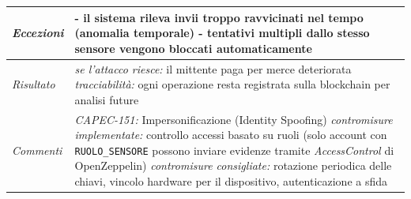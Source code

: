 \begin{longtable}{| >{\columncolor{abuseCol}}p{} | p{} |}
\hline
\textit{Eccezioni} & - il sistema rileva invii troppo ravvicinati nel tempo (anomalia temporale) \newline - tentativi multipli dallo stesso sensore vengono bloccati automaticamente \\
\hline
\textit{Risultato} & \textit{se l'attacco riesce:} il mittente paga per merce deteriorata \newline \textit{tracciabilità:} ogni operazione resta registrata sulla blockchain per analisi future \\
\hline
\textit{Commenti} & \textit{CAPEC-151:} Impersonificazione (Identity Spoofing) \newline \textit{contromisure implementate:} controllo accessi basato su ruoli (solo account con \texttt{RUOLO\_SENSORE} possono inviare evidenze tramite \textit{AccessControl} di OpenZeppelin) \newline \textit{contromisure consigliate:} rotazione periodica delle chiavi, vincolo hardware per il dispositivo, autenticazione a sfida \\
\hline
\end{longtable}

